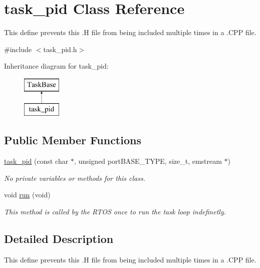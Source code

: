 \hypertarget{classtask__pid}{\section{task\-\_\-pid Class Reference}
\label{classtask__pid}
}


This define prevents this .H file from being included multiple times in a .C\-P\-P file.  




{\ttfamily \#include $<$task\-\_\-pid.\-h$>$}

Inheritance diagram for task\-\_\-pid\-:\begin{figure}[H]
\begin{center}
\leavevmode
\includegraphics[height=2.000000cm]{classtask__pid}
\end{center}
\end{figure}
\subsection*{Public Member Functions}
\begin{DoxyCompactItemize}
\item 
\hyperlink{classtask__pid_a4c13bec6d43bd4cea284d0a74645db5a}{task\-\_\-pid} (const char $\ast$, unsigned port\-B\-A\-S\-E\-\_\-\-T\-Y\-P\-E, size\-\_\-t, emstream $\ast$)
\begin{DoxyCompactList}\small\item\em No private variables or methods for this class. \end{DoxyCompactList}\item 
void \hyperlink{classtask__pid_a5f113fb33b9bbecb5986ed9c8551d8e4}{run} (void)
\begin{DoxyCompactList}\small\item\em This method is called by the R\-T\-O\-S once to run the task loop indefinetly. \end{DoxyCompactList}\end{DoxyCompactItemize}


\subsection{Detailed Description}
This define prevents this .H file from being included multiple times in a .C\-P\-P file. 

